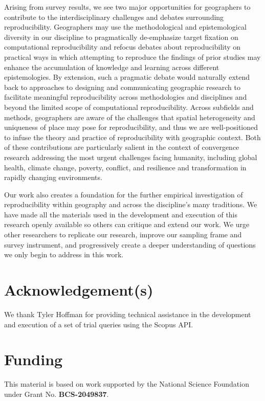 \documentclass[]{interact}
\theoremstyle{plain}%
\theoremstyle{definition}
\theoremstyle{remark}
\begin{document}
Arising from survey results, we see two major opportunities for geographers to contribute to the interdisciplinary challenges and debates surrounding reproducibility.
Geographers may use the methodological and epistemological diversity in our discipline to pragmatically de-emphasize target fixation on computational reproducibility and refocus debates about reproducibility on practical ways in which attempting to reproduce the findings of prior studies may enhance the accumulation of knowledge and learning across different epistemologies.
By extension, such a pragmatic debate would naturally extend back to approaches to designing and communicating geographic research to facilitate meaningful reproducibility across methodologies and disciplines and beyond the limited scope of computational reproducibility.
Across subfields and methods, geographers are aware of the challenges that spatial heterogeneity and uniqueness of place may pose for reproducibility, and thus we are well-positioned to infuse the theory and practice of reproducibility with geographic context.
Both of these contributions are particularly salient in the context of convergence research addressing the most urgent challenges facing humanity, including global health, climate change, poverty, conflict, and resilience and transformation in rapidly changing environments.

Our work also creates a foundation for the further empirical investigation of reproducibility within geography and across the discipline's many traditions. 
We have made all the materials used in the development and execution of this research openly available so others can critique and extend our work.
We urge other researchers to replicate our research, improve our sampling frame and survey instrument, and progressively create a deeper understanding of questions we only begin to address in this work. 


\theendnotes


\section*{Acknowledgement(s)}
We thank Tyler Hoffman for providing technical assistance in the development and execution of a set of trial queries using the Scopus API.

\section*{Funding}
This material is based on work supported by the National Science Foundation under Grant No. \textbf{BCS-2049837}.
\end{document}
